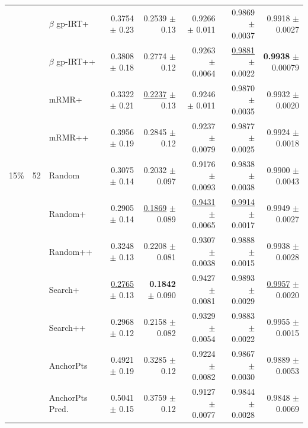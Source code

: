 \begin{longtable}{llp{}rrrrr}
 &  & $\beta$ gp-IRT+ & 0.3754 {\scriptsize $\pm$ 0.23} & 0.2539 {\scriptsize $\pm$ 0.13} & 0.9266 {\scriptsize $\pm$ 0.011} & 0.9869 {\scriptsize $\pm$ 0.0037} & 0.9918 {\scriptsize $\pm$ 0.0027} \\
 &  & $\beta$ gp-IRT++ & 0.3808 {\scriptsize $\pm$ 0.18} & 0.2774 {\scriptsize $\pm$ 0.12} & 0.9263 {\scriptsize $\pm$ 0.0064} & \underline{0.9881} {\scriptsize $\pm$ 0.0022} & \textbf{0.9938} {\scriptsize $\pm$ 0.00079} \\
 &  & mRMR+ & 0.3322 {\scriptsize $\pm$ 0.21} & \underline{0.2237} {\scriptsize $\pm$ 0.13} & 0.9246 {\scriptsize $\pm$ 0.011} & 0.9870 {\scriptsize $\pm$ 0.0035} & 0.9932 {\scriptsize $\pm$ 0.0020} \\
 &  & mRMR++ & 0.3956 {\scriptsize $\pm$ 0.19} & 0.2845 {\scriptsize $\pm$ 0.12} & 0.9237 {\scriptsize $\pm$ 0.0079} & 0.9877 {\scriptsize $\pm$ 0.0025} & 0.9924 {\scriptsize $\pm$ 0.0018} \\
\midrule
15\% & 52 & Random & 0.3075 {\scriptsize $\pm$ 0.14} & 0.2032 {\scriptsize $\pm$ 0.097} & 0.9176 {\scriptsize $\pm$ 0.0093} & 0.9838 {\scriptsize $\pm$ 0.0038} & 0.9900 {\scriptsize $\pm$ 0.0043} \\
 &  & Random+ & 0.2905 {\scriptsize $\pm$ 0.14} & \underline{0.1869} {\scriptsize $\pm$ 0.089} & \underline{0.9431} {\scriptsize $\pm$ 0.0065} & \underline{0.9914} {\scriptsize $\pm$ 0.0017} & 0.9949 {\scriptsize $\pm$ 0.0027} \\
 &  & Random++ & 0.3248 {\scriptsize $\pm$ 0.13} & 0.2208 {\scriptsize $\pm$ 0.081} & 0.9307 {\scriptsize $\pm$ 0.0038} & 0.9888 {\scriptsize $\pm$ 0.0015} & 0.9938 {\scriptsize $\pm$ 0.0028} \\
 &  & Search+ & \underline{0.2765} {\scriptsize $\pm$ 0.13} & \textbf{0.1842} {\scriptsize $\pm$ 0.090} & 0.9427 {\scriptsize $\pm$ 0.0081} & 0.9893 {\scriptsize $\pm$ 0.0029} & \underline{0.9957} {\scriptsize $\pm$ 0.0020} \\
 &  & Search++ & 0.2968 {\scriptsize $\pm$ 0.12} & 0.2158 {\scriptsize $\pm$ 0.082} & 0.9329 {\scriptsize $\pm$ 0.0054} & 0.9883 {\scriptsize $\pm$ 0.0022} & 0.9955 {\scriptsize $\pm$ 0.0015} \\
 &  & AnchorPts & 0.4921 {\scriptsize $\pm$ 0.19} & 0.3285 {\scriptsize $\pm$ 0.12} & 0.9224 {\scriptsize $\pm$ 0.0082} & 0.9867 {\scriptsize $\pm$ 0.0030} & 0.9889 {\scriptsize $\pm$ 0.0053} \\
 &  & AnchorPts Pred. & 0.5041 {\scriptsize $\pm$ 0.15} & 0.3759 {\scriptsize $\pm$ 0.12} & 0.9127 {\scriptsize $\pm$ 0.0077} & 0.9844 {\scriptsize $\pm$ 0.0028} & 0.9848 {\scriptsize $\pm$ 0.0069} \\

\end{longtable}
